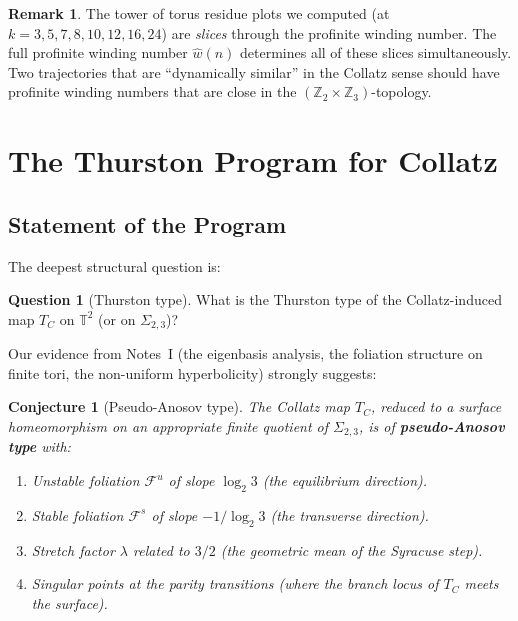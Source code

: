 \documentclass[11pt,a4paper]{article}
\newcommand{\Z}{\mathbb{Z}}
\newcommand{\T}{\mathbb{T}}
\theoremstyle{plain}
\newtheorem{conjecture}[theorem]{Conjecture}
\theoremstyle{definition}
\newtheorem{remark}[theorem]{Remark}
\newtheorem{question}[theorem]{Question}
\begin{document}
\begin{remark}
    The tower of torus residue plots we computed (at $k = 3, 5, 7, 8, 10, 12, 16, 24$) are \emph{slices} through the profinite winding number. The full profinite winding number $\hat{w}(n)$ determines all of these slices simultaneously. Two trajectories that are ``dynamically similar'' in the Collatz sense should have profinite winding numbers that are close in the $(\Z_2 \times \Z_3)$-topology.
\end{remark}

\section{The Thurston Program for Collatz}\label{sec:thurston}

\subsection{Statement of the Program}

The deepest structural question is:

\begin{question}[Thurston type]\label{q:thurston}
    What is the Thurston type of the Collatz-induced map $T_C$ on $\T^2$ (or on $\Sigma_{2,3}$)?
\end{question}

Our evidence from Notes~I (the eigenbasis analysis, the foliation structure on finite tori, the non-uniform hyperbolicity) strongly suggests:

\begin{conjecture}[Pseudo-Anosov type]\label{conj:pa}
    The Collatz map $T_C$, reduced to a surface homeomorphism on an appropriate finite quotient of $\Sigma_{2,3}$, is of \textbf{pseudo-Anosov type} with:
    \begin{enumerate}
        \item Unstable foliation $\mathcal{F}^u$ of slope $\log_2 3$ (the equilibrium direction).
        \item Stable foliation $\mathcal{F}^s$ of slope $-1/\log_2 3$ (the transverse direction).
        \item Stretch factor $\lambda$ related to $3/2$ (the geometric mean of the Syracuse step).
        \item Singular points at the parity transitions (where the branch locus of $T_C$ meets the surface).
    \end{enumerate}
\end{conjecture}
\end{document}
